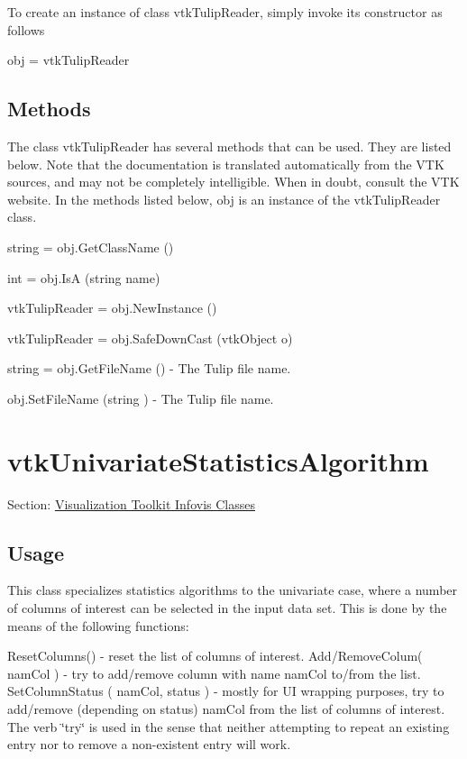 To create an instance of class vtk\-Tulip\-Reader, simply invoke its constructor as follows \begin{DoxyVerb}  obj = vtkTulipReader
\end{DoxyVerb}
 \hypertarget{vtkwidgets_vtkxyplotwidget_Methods}{}\subsection{Methods}\label{vtkwidgets_vtkxyplotwidget_Methods}
The class vtk\-Tulip\-Reader has several methods that can be used. They are listed below. Note that the documentation is translated automatically from the V\-T\-K sources, and may not be completely intelligible. When in doubt, consult the V\-T\-K website. In the methods listed below, {\ttfamily obj} is an instance of the vtk\-Tulip\-Reader class. 
\begin{DoxyItemize}
\item {\ttfamily string = obj.\-Get\-Class\-Name ()}  
\item {\ttfamily int = obj.\-Is\-A (string name)}  
\item {\ttfamily vtk\-Tulip\-Reader = obj.\-New\-Instance ()}  
\item {\ttfamily vtk\-Tulip\-Reader = obj.\-Safe\-Down\-Cast (vtk\-Object o)}  
\item {\ttfamily string = obj.\-Get\-File\-Name ()} -\/ The Tulip file name.  
\item {\ttfamily obj.\-Set\-File\-Name (string )} -\/ The Tulip file name.  
\end{DoxyItemize}\hypertarget{vtkinfovis_vtkunivariatestatisticsalgorithm}{}\section{vtk\-Univariate\-Statistics\-Algorithm}\label{vtkinfovis_vtkunivariatestatisticsalgorithm}
Section\-: \hyperlink{sec_vtkinfovis}{Visualization Toolkit Infovis Classes} \hypertarget{vtkwidgets_vtkxyplotwidget_Usage}{}\subsection{Usage}\label{vtkwidgets_vtkxyplotwidget_Usage}
This class specializes statistics algorithms to the univariate case, where a number of columns of interest can be selected in the input data set. This is done by the means of the following functions\-:

Reset\-Columns() -\/ reset the list of columns of interest. Add/\-Remove\-Colum( nam\-Col ) -\/ try to add/remove column with name nam\-Col to/from the list. Set\-Column\-Status ( nam\-Col, status ) -\/ mostly for U\-I wrapping purposes, try to add/remove (depending on status) nam\-Col from the list of columns of interest. The verb \char`\"{}try\char`\"{} is used in the sense that neither attempting to repeat an existing entry nor to remove a non-\/existent entry will work.

